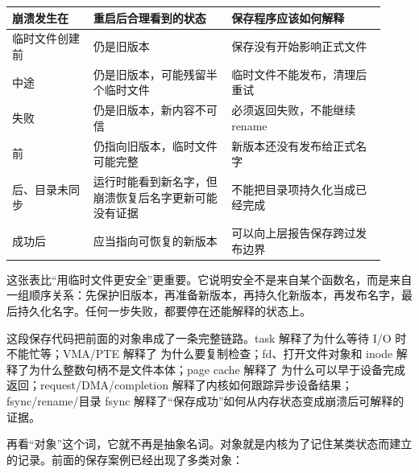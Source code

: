 \begin{longtable}{|L{0.2\linewidth}|L{0.34\linewidth}|L{0.38\linewidth}|}
\toprule
崩溃发生在 & 重启后合理看到的状态 & 保存程序应该如何解释 \\
\midrule
临时文件创建前 &  仍是旧版本 & 保存没有开始影响正式文件 \\\tablerowrule
{} 中途 &  仍是旧版本，可能残留半个临时文件 & 临时文件不能发布，清理后重试 \\\tablerowrule
{} 失败 &  仍是旧版本，新内容不可信 & 必须返回失败，不能继续 rename \\\tablerowrule
{} 前 &  仍指向旧版本，临时文件可能完整 & 新版本还没有发布给正式名字 \\\tablerowrule
{} 后、目录未同步 & 运行时能看到新名字，但崩溃恢复后名字更新可能没有证据 & 不能把目录项持久化当成已经完成 \\\tablerowrule
{} 成功后 &  应当指向可恢复的新版本 & 可以向上层报告保存跨过发布边界 \\
\bottomrule
\end{longtable}

这张表比“用临时文件更安全”更重要。它说明安全不是来自某个函数名，而是来自一组顺序关系：先保护旧版本，再准备新版本，再持久化新版本，再发布名字，最后持久化名字。任何一步失败，都要停在还能解释的状态上。

这段保存代码把前面的对象串成了一条完整链路。task 解释了为什么等待 I/O 时不能忙等；VMA/PTE 解释了  为什么要复制检查；fd、打开文件对象和 inode 解释了为什么整数句柄不是文件本体；page cache 解释了  为什么可以早于设备完成返回；request/DMA/completion 解释了内核如何跟踪异步设备结果；fsync/rename/目录 fsync 解释了“保存成功”如何从内存状态变成崩溃后可解释的证据。

再看“对象”这个词，它就不再是抽象名词。对象就是内核为了记住某类状态而建立的记录。前面的保存案例已经出现了多类对象：

